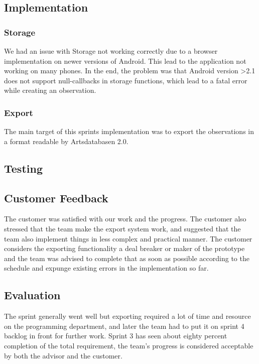 	\subsection{Implementation}
    \subsubsection{Storage}
    We had an issue with Storage not working correctly due to a browser implementation on newer versions of Android. This lead to the application not working on many  phones. In the end, the problem was that Android version >2.1 does not support null-callbacks in storage functions, which lead to a fatal error while creating an observation. 

    \subsubsection{Export}
    The main target of this sprints implementation was to export the observations in a format readable by Artsdatabasen 2.0. 

	\subsection{Testing}

	\subsection{Customer Feedback}
The customer was satisfied with our work and the progress. The customer also stressed that the team make the export system work, and suggested that the team also implement things in less complex and practical manner. The customer considers the exporting functionality a deal breaker or maker of the prototype and the team was advised to complete that as soon as possible according to the schedule and expunge existing errors in the implementation so far.
	\subsection{Evaluation}
The sprint generally went well but exporting required a lot of time and resource on the programming department, and later the team had to put it on sprint 4 backlog in front for further work. Sprint 3 has seen about eighty percent completion of the total requirement, the team's progress is considered acceptable by both the advisor and the customer. 

